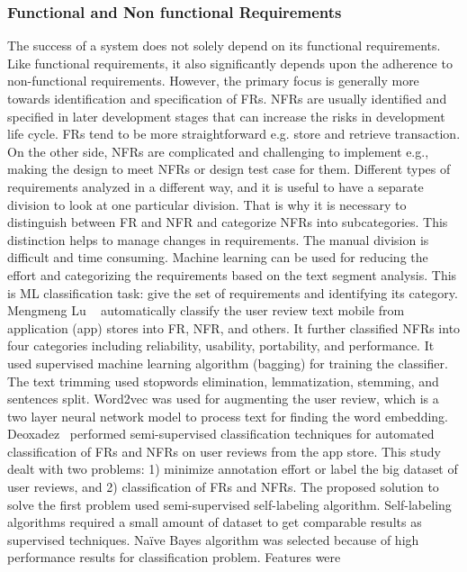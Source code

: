 \subsubsection{Functional and Non functional Requirements}
The success of a system does not solely depend on its functional requirements.
Like functional requirements, it also significantly depends upon the adherence
to non-functional requirements. However, the primary focus is generally more
towards identification and specification of FRs. NFRs are usually identified and
specified in later development stages that can increase the risks in development
life cycle. FRs tend to be more straightforward e.g. store and retrieve
transaction. On the other side, NFRs are complicated and challenging to
implement e.g., making the design to meet NFRs or design test case for them.
Different types of requirements analyzed in a different way, and it is useful to
have a separate division to look at one particular division. That is why it is
necessary to distinguish between FR and NFR and categorize NFRs into
subcategories. This distinction helps to manage changes in requirements. The
manual division is difficult and time consuming. Machine learning can be used
for reducing the effort and categorizing the requirements based on the text
segment analysis. This is ML classification task: give the set of requirements
and identifying its category.\\
Mengmeng Lu \etal~ \cite{Lu:2017} automatically classify the user review text
mobile from application (app) stores  into FR, NFR, and others. It further
classified NFRs into four categories including reliability, usability,
portability, and performance. It used supervised machine learning algorithm
(bagging) for training the classifier. The text trimming used stopwords
elimination, lemmatization, stemming, and sentences split. Word2vec was used for
augmenting the user review, which is a two layer neural network model to process
text for finding the word embedding. Deoxadez
\etal~\cite{Deocadez:2017}performed semi-supervised classification techniques
for automated classification of FRs and NFRs on user reviews from the app store.
This study dealt with two problems: 1) minimize annotation effort or label the
big dataset of user reviews, and 2) classification of FRs and NFRs. The proposed
solution to solve the first problem used semi-supervised self-labeling
algorithm. Self-labeling algorithms required a small amount of dataset to get
comparable results as supervised techniques. Naïve Bayes algorithm was selected
because of high performance results for classification problem. Features were
